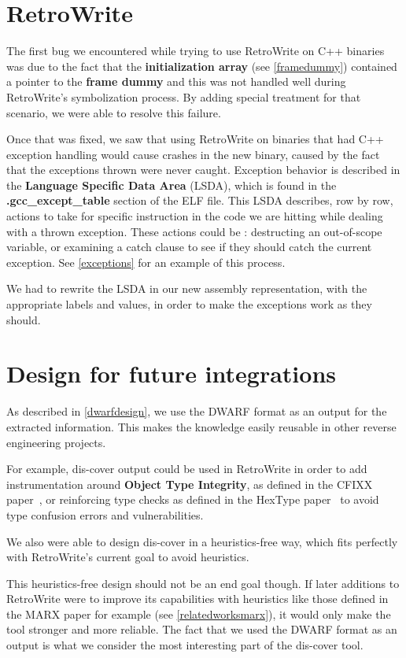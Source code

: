 \documentclass[a4paper,11pt,oneside]{report}
\begin{document}
\section{RetroWrite}
\label{retrowritedesign}

The first bug we encountered while trying to use RetroWrite on C++ binaries
was due to the fact that the \textbf{initialization array} (see
\autoref{framedummy}) contained a pointer to the \textbf{frame dummy} and this
was not handled well during RetroWrite's symbolization process.
By adding special treatment for that scenario, we were able to resolve this
failure.

Once that was fixed, we saw that using RetroWrite on binaries that had C++
exception handling would cause crashes in the new binary, caused by the fact
that the exceptions thrown were never caught.
Exception behavior is described in the \textbf{Language Specific Data Area}
(LSDA), which is found in the \textbf{.gcc\_except\_table} section of the ELF
file.
This LSDA describes, row by row, actions to take for specific instruction in
the code we are hitting while dealing with a thrown exception. These actions
could be : destructing an out-of-scope variable, or examining a catch clause
to see if they should catch the current exception. See \autoref{exceptions}
for an example of this process.

We had to rewrite the LSDA in our new assembly representation, with the
appropriate labels and values, in order to make the exceptions work as they
should.

\section{Design for future integrations}

As described in \autoref{dwarfdesign}, we use the DWARF format as an output
for the extracted information. This makes the knowledge easily reusable in
other reverse engineering projects.

For example, dis-cover output could be used in RetroWrite in order to add
instrumentation around \textbf{Object Type Integrity}, as defined in the CFIXX
paper~\cite{cfixx}, or reinforcing type checks as defined in the HexType
paper~\cite{hextype} to avoid type confusion errors and vulnerabilities.

We also were able to design dis-cover in a heuristics-free way, which fits
perfectly with RetroWrite's current goal to avoid heuristics.

This heuristics-free design should not be an end goal though.
If later additions to RetroWrite were to improve its capabilities with
heuristics like those defined in the MARX paper for example (see
\autoref{relatedworksmarx}), it would only make the tool stronger and more
reliable.
The fact that we used the DWARF format as an output is what we consider the
most interesting part of the dis-cover tool.
\end{document}
